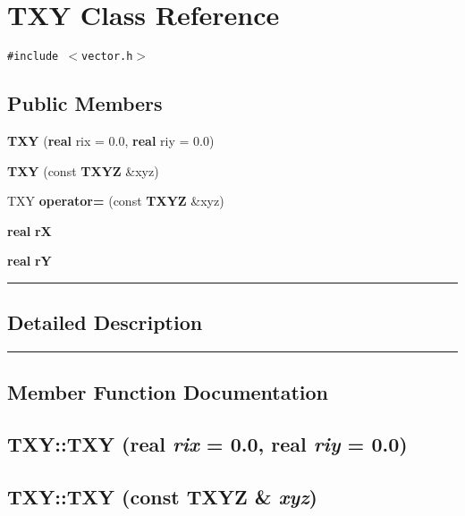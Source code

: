 \section{TXY  Class Reference}
\label{TXY}


{\tt \#include $<$vector.h$>$}

\subsection*{Public Members}
\begin{CompactItemize}
\item 
{\bf TXY} ({\bf real} rix = 0.0, {\bf real} riy = 0.0)
\item 
{\bf TXY} (const {\bf TXYZ} \&xyz)
\item 
TXY {\bf operator=} (const {\bf TXYZ} \&xyz)
\item 
{\bf real} {\bf r\-X}
\item 
{\bf real} {\bf r\-Y}
\end{CompactItemize}
\vspace{0.4cm}\hrule\vspace{0.2cm}
\subsection*{Detailed Description}
\vspace{0.4cm}\hrule\vspace{0.2cm}
\subsection*{Member Function Documentation}
\label{TXY_a0}
\subsection{\setlength{\rightskip}{0pt plus 5cm}TXY::TXY ({\bf real} {\em rix} = 0.0, {\bf real} {\em riy} = 0.0)\hspace{0.3cm}{\tt  [inline]}}

\label{TXY_a1}
\subsection{\setlength{\rightskip}{0pt plus 5cm}TXY::TXY (const {\bf TXYZ} \& {\em xyz})\hspace{0.3cm}{\tt  [inline]}}

\label{TXY_a2}
